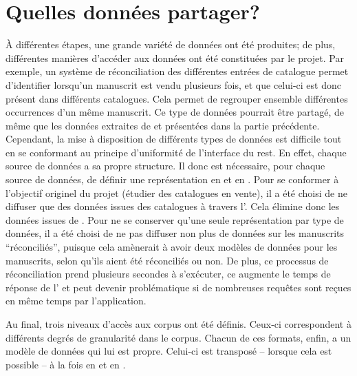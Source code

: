 \section{Quelles données partager?}
À différentes étapes, une grande variété de données ont été produites; de plus, différentes manières d'accéder aux données ont été constituées par le projet. Par exemple, un système de réconciliation des différentes entrées de catalogue permet d'identifier lorsqu'un manuscrit est vendu plusieurs fois, et que celui-ci est donc présent dans différents catalogues. Cela permet de regrouper ensemble différentes occurrences d'un même manuscrit. Ce type de données pourrait être partagé, de même que les données extraites de \sparql{} et présentées dans la partie précédente. Cependant, la mise à disposition de différents types de données est difficile tout en se conformant au principe d'uniformité de l'interface du \gls{rest}. En effet, chaque source de données a sa propre structure. Il donc est nécessaire, pour chaque source de données, de définir une représentation en \json{} et en \tei{}. Pour se conformer à l'objectif originel du projet \mssktb{} (étudier des catalogues en vente), il a été choisi de ne diffuser que des données issues des catalogues à travers l'\api{}. Cela élimine donc les données issues de \sparql{}. Pour ne se conserver qu'une seule représentation par type de données, il a été choisi de ne pas diffuser non plus de données sur les manuscrits \enquote{réconciliés}, puisque cela amènerait à avoir deux modèles de données pour les manuscrits, selon qu'ils aient été réconciliés ou non. De plus, ce processus de réconciliation prend plusieurs secondes à s'exécuter, ce augmente le temps de réponse de l'\api{} et peut devenir problématique si de nombreuses requêtes sont reçues en même temps par l'application.

Au final, trois niveaux d'accès aux corpus ont été définis. Ceux-ci correspondent à différents degrés de granularité dans le corpus. Chacun de ces formats, enfin, a un modèle de données qui lui est propre. Celui-ci est transposé -- lorsque cela est possible -- à la fois en \xmltei{} et en \json{}. 

